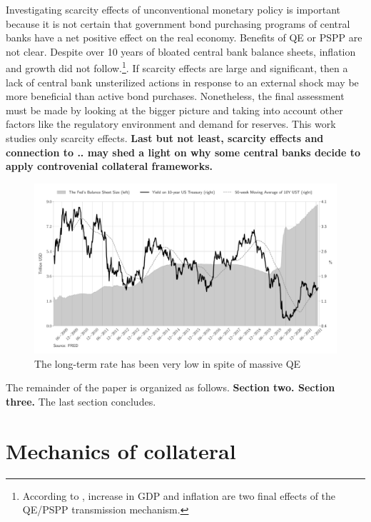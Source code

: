 \documentclass[11pt,a4paper,english,oneside]{article}
\begin{document}
Investigating scarcity effects of unconventional monetary policy is important because it is not certain that government bond purchasing programs of central banks have a net positive effect on the real economy. Benefits of QE or PSPP are not clear. Despite over 10 years of bloated central bank balance sheets, inflation and growth did not follow.\footnote{According to \citet{gern2015}, increase in GDP and inflation are two final effects of the QE/PSPP transmission mechanism.}. If scarcity effects are large and significant, then a lack of central bank unsterilized actions in response to an external shock may be more beneficial than active bond purchases. Nonetheless, the final assessment must be made by looking at the bigger picture and taking into account other factors like the regulatory environment and demand for reserves. This work studies only scarcity effects. \textbf{Last but not least, scarcity effects and connection to .. may shed a light on why some central banks decide to apply controvenial collateral frameworks.}

\begin{figure}[htb!]
  \begin{center}
    \caption{The long-term rate has been very low in spite of massive QE}
    \includegraphics[width=0.99\linewidth]{fed_bs.pdf}
  \end{center}
  \label{Feds_BS}
\end{figure}

The remainder of the paper is organized as follows. \textbf{Section two. Section three.} The last section concludes.

\newpage

\section{Mechanics of collateral} \label{sec:mechanics} %
\end{document}
